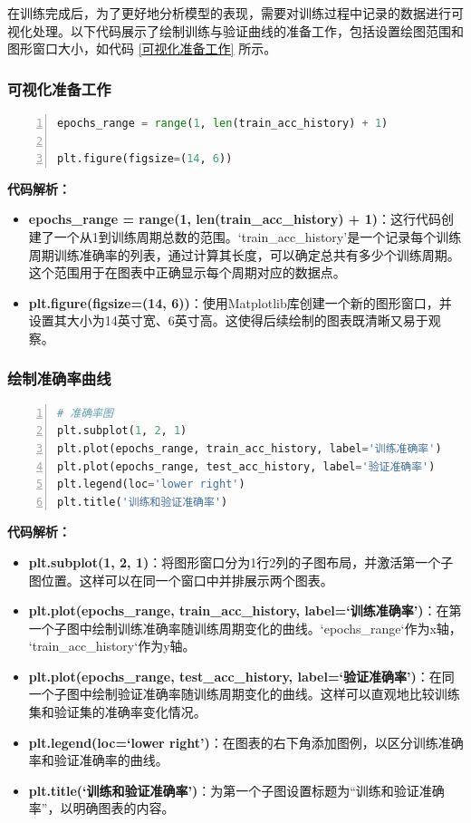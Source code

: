 在训练完成后，为了更好地分析模型的表现，需要对训练过程中记录的数据进行可视化处理。以下代码展示了绘制训练与验证曲线的准备工作，包括设置绘图范围和图形窗口大小，如代码 \ref{可视化准备工作} 所示。

\subsubsection{可视化准备工作}
\begin{lstlisting}[language={python},label={可视化准备工作},caption={可视化准备工作}, basicstyle=\footnotesize\ttfamily, breaklines=true, numbers=left, frame=single,keepspaces=true,showstringspaces=false]
epochs_range = range(1, len(train_acc_history) + 1)

plt.figure(figsize=(14, 6))
\end{lstlisting}
\textbf{代码解析：}
\begin{itemize}
    \item \textbf{epochs\_range = range(1, len(train\_acc\_history) + 1)}：这行代码创建了一个从1到训练周期总数的范围。`train\_acc\_history'是一个记录每个训练周期训练准确率的列表，通过计算其长度，可以确定总共有多少个训练周期。这个范围用于在图表中正确显示每个周期对应的数据点。
    \item \textbf{plt.figure(figsize=(14, 6))}：使用Matplotlib库创建一个新的图形窗口，并设置其大小为14英寸宽、6英寸高。这使得后续绘制的图表既清晰又易于观察。
\end{itemize}

\subsubsection{绘制准确率曲线}
\begin{lstlisting}[language={python},label={绘制准确率曲线},caption={绘制准确率曲线}, basicstyle=\footnotesize\ttfamily, breaklines=true, numbers=left, frame=single]
# 准确率图
plt.subplot(1, 2, 1)
plt.plot(epochs_range, train_acc_history, label='训练准确率')
plt.plot(epochs_range, test_acc_history, label='验证准确率')
plt.legend(loc='lower right')
plt.title('训练和验证准确率')
\end{lstlisting}
\textbf{代码解析：}
\begin{itemize}
    \item \textbf{plt.subplot(1, 2, 1)}：将图形窗口分为1行2列的子图布局，并激活第一个子图位置。这样可以在同一个窗口中并排展示两个图表。
    \item \textbf{plt.plot(epochs\_range, train\_acc\_history, label=‘训练准确率’)}：在第一个子图中绘制训练准确率随训练周期变化的曲线。`epochs\_range`作为x轴，\\`train\_acc\_history`作为y轴。
    \item \textbf{plt.plot(epochs\_range, test\_acc\_history, label=‘验证准确率’)}：在同一个子图中绘制验证准确率随训练周期变化的曲线。这样可以直观地比较训练集和验证集的准确率变化情况。
    \item \textbf{plt.legend(loc=‘lower right’)}：在图表的右下角添加图例，以区分训练准确率和验证准确率的曲线。
    \item \textbf{plt.title(‘训练和验证准确率’)}：为第一个子图设置标题为“训练和验证准确率”，以明确图表的内容。
\end{itemize}

